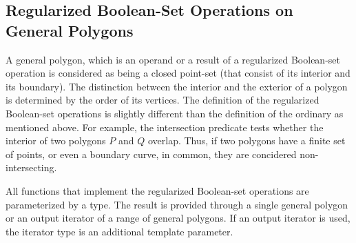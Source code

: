 \subsection{Regularized Boolean-Set Operations on General Polygons}
\label{bobs_ssec:regularized_bops}
A general polygon, which is an operand or a result of a regularized
Boolean-set operation is considered as being a closed point-set (that
consist of its interior and its boundary). The distinction between the
interior and  the exterior of a polygon is determined by the order of
its vertices. The definition of the regularized Boolean-set operations 
is slightly different than the definition of the ordinary as mentioned
above. For example, the intersection predicate tests whether the
interior of two polygons $P$ and $Q$ overlap. Thus, if two polygons
have a finite set of points, or even a boundary curve, in common, they
are concidered non-intersecting.

All functions that implement the regularized Boolean-set operations
are parameterized by a  type. The
result is provided through a single general polygon or an output
iterator of a range of general polygons. If  an output iterator is
used, the iterator type is an additional template parameter.

